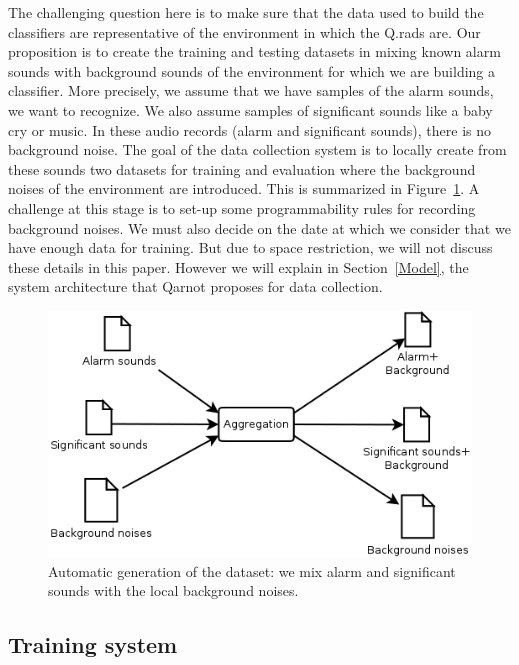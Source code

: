 \documentclass[10pt, conference, compsocconf]{IEEEtran}
\begin{document}
The challenging question here is to make sure that the data used to build the classifiers are representative of the environment 
in which the Q.rads are. Our proposition is to create the training and testing datasets in mixing known alarm sounds with 
background sounds of the environment for which we are building a classifier. More precisely, we assume that we have 
samples of the alarm sounds, we want to recognize. We also assume samples of significant sounds like a baby cry or music. 
In these audio records (alarm and significant sounds), there is no background noise. The goal of the data collection 
system is to locally create from these sounds two datasets for training and evaluation where 
the background noises of the environment are introduced. This is summarized in Figure~\ref{fig:gen}. 
A challenge at this stage is to set-up some programmability rules for recording background noises. We must also decide on the date at which we consider that we have enough data for training. But due to space restriction, we will not discuss these details in this paper. However we will explain in Section~\ref{Model}, the 
system architecture that Qarnot proposes for data collection.

	\begin{figure}[hbtp]
	\begin{center}
	\includegraphics[scale=0.3]{./Figures/Aggregation.png}
	\caption{Automatic generation of the dataset: we mix alarm and significant sounds with the local background noises.}
	\label{fig:gen}
	\end{center}
	\end{figure}


\subsection{Training system}
\end{document}
